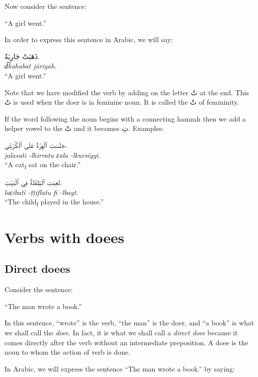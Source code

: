 \documentclass[
  10pt,
]{book}
\begin{document}
Now consider the sentence:

\enquote{A girl went.}

In order to express this sentence in Arabic, we will say:

\foreignlanguage{arabic}{ذَهَبَتْ جَارِيَةٌ.}\\
\emph{d͡hahabat jāriyah.}\\
\enquote{A girl went.}

Note that we have modified the verb by adding on the letter \foreignlanguage{arabic}{تْ} at the end. This \foreignlanguage{arabic}{تْ} is used when the doer is ia feminine noun. It is called the \foreignlanguage{arabic}{تْ} of femininity.

If the word following the noun begins with a connecting hamzah then we add a helper vowel to the \foreignlanguage{arabic}{تْ} and it becomes \foreignlanguage{arabic}{تِ}. Examples:

\foreignlanguage{arabic}{جَلَسَتِ ٱلْهِرَّةُ عَلَى ٱلْکُرْسِيِّ.}\\
\emph{jalasati -lhirratu ɛala -lkursiyyi.}\\
\enquote{A cat\textsubscript{f} sat on the chair.}

\foreignlanguage{arabic}{لَعِبَتِ ٱلطِّفْلَةُ فِي ٱلْبَيْتِ.}\\
\emph{laɛibati -ṭṭiflatu fi -lbayt.}\\
\enquote{The child\textsubscript{f} played in the house.}

\section{Verbs with doees}\label{verbs-with-doees}

\subsection{Direct doees}\label{direct-doees}

Consider the sentence:

\enquote{The man wrote a book.}

In this sentence, \enquote{wrote} is the verb, \enquote{the man} is the doer, and \enquote{a book} is what we shall call the \emph{doee}. In fact, it is what we shall call a \emph{direct doee} because it comes directly after the verb without an intermediate preposition. A doee is the noun to whom the action of verb is done.

In Arabic, we will express the sentence \enquote{The man wrote a book.} by saying:
\end{document}
